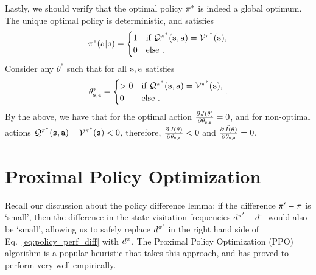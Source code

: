 Lastly, we should verify that the optimal policy $\pi^*$ is indeed a global optimum. The unique optimal policy is deterministic, and satisfies 
$$\pi^*({\tt a}|{\tt s}) = \begin{cases}
        1 & \text{if } \mathcal{Q}^{\pi^*}({\tt s},{\tt a}) = \mathcal{V}^{\pi^*}({\tt s}), \\
0 & \text{else }.
\end{cases}$$
Consider any $\theta^*$ such that for all ${\tt s},{\tt a}$ satisfies $$\theta^*_{{\tt s},{\tt a}} = \begin{cases}
        >0 & \text{if } \mathcal{Q}^{\pi^*}({\tt s},{\tt a}) = \mathcal{V}^{\pi^*}({\tt s}), \\
0 & \text{else }.
\end{cases}.$$ 
By the above, we have that for the optimal action $\frac{\partial J(\theta)}{\partial \theta_{{\tt s},{\tt a}}} = 0$, and for non-optimal actions $\mathcal{Q}^{\pi^*}({\tt s},{\tt a}) - \mathcal{V}^{\pi^*}({\tt s}) < 0$, therefore, $\frac{\partial J(\theta)}{\partial \theta_{{\tt s},{\tt a}}} < 0$ and $\tilde{\frac{\partial J(\theta)}{\partial \theta_{{\tt s},{\tt a}}}} = 0$.

\section{Proximal Policy Optimization}

Recall our discussion about the policy difference lemma: if the difference $\pi' - \pi$ is `small', then the difference in the state visitation frequencies $d^{\pi'} - d^{\pi}$ would also be `small', allowing us to safely replace $d^{\pi'}$ in the right hand side of Eq.~\ref{eq:policy_perf_diff} with $d^{\pi}$. The Proximal Policy Optimization (PPO) algorithm is a popular heuristic that takes this approach, and has proved to perform very well empirically.


